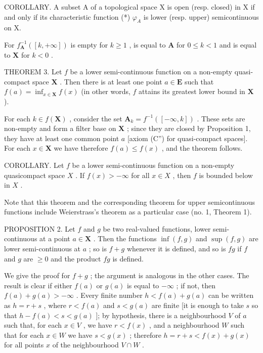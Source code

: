 COROLLARY. A subset A of a topological space X is open (resp. closed) in X if and only if its characteristic function (*) \(\varphi_{A}\) is lower (resp. upper) semicontinuous on X.

For \(f_{\mathbf{A}}^{-1}([k, +\infty])\) is empty for \(k \geqslant 1\) , is equal to \(\mathbf{A}\) for \(0 \leqslant k < 1\) and is equal to \(\mathbf{X}\) for \(k < 0\) .

THEOREM 3. Let \(f\) be a lower semi-continuous function on a non-empty quasi-compact space \(\mathbf{X}\) . Then there is at least one point \(a \in \mathbf{E}\) such that \(f(a) = \inf_{x \in \mathbf{X}} f(x)\) (in other words, \(f\) attains its greatest lower bound in \(\mathbf{X}\) ).

For each \(k \in f(\mathbf{X})\) , consider the set \(\mathbf{A}_k = f^{-1}([-\infty, k])\) . These sets are non-empty and form a filter base on \(\mathbf{X}\) ; since they are closed by Proposition 1, they have at least one common point \(a\) {[}axiom (C'') for quasi-compact spaces{]}. For each \(x \in \mathbf{X}\) we have therefore \(f(a) \leqslant f(x)\) , and the theorem follows.

COROLLARY. Let \(f\) be a lower semi-continuous function on a non-empty quasicompact space \(X\) . If \(f(x) > -\infty\) for all \(x \in X\) , then \(f\) is bounded below in \(X\) .

Note that this theorem and the corresponding theorem for upper semicontinuous functions include Weierstrass's theorem as a particular case (no. 1, Theorem 1).

PROPOSITION 2. Let \(f\) and \(g\) be two real-valued functions, lower semi-continuous at a point \(a \in \mathbf{X}\) . Then the functions \(\inf(f, g)\) and \(\sup(f, g)\) are lower semi-continuous at \(a\) ; so is \(f + g\) whenever it is defined, and so is \(fg\) if \(f\) and \(g\) are \(\geqslant 0\) and the product \(fg\) is defined.

We give the proof for \(f + g\) ; the argument is analogous in the other cases. The result is clear if either \(f(a)\) or \(g(a)\) is equal to \(-\infty\) ; if not, then \(f(a) + g(a) > -\infty\) . Every finite number \(h < f(a) + g(a)\) can be written as \(h = r + s\) , where \(r < f(a)\) and \(s < g(a)\) are finite {[}it is enough to take \(s\) so that \(h - f(a) < s < g(a)\) {]}; by hypothesis, there is a neighbourhood \(V\) of \(a\) such that, for each \(x \in V\) , we have \(r < f(x)\) , and a neighbourhood \(W\) such that for each \(x \in W\) we have \(s < g(x)\) ; therefore \(h = r + s < f(x) + g(x)\) for all points \(x\) of the neighbourhood \(V \cap W\) .

